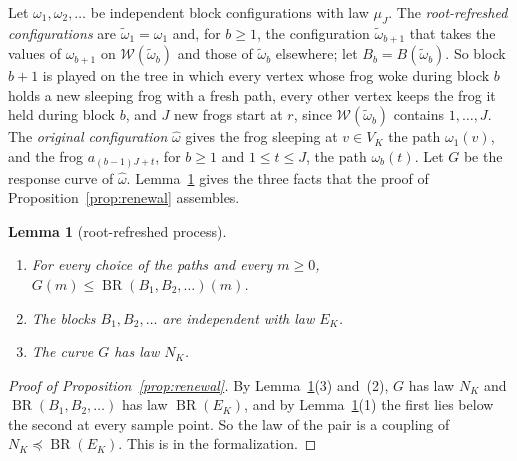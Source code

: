 \documentclass[11pt]{amsart}
\newtheorem{lemma}[theorem]{Lemma}
\theoremstyle{definition}
\numberwithin{equation}{section}
\newcommand{\lean}[1]{\ignorespaces}
\newcommand{\BR}{\operatorname{BR}}
\newcommand{\cW}{\mathcal{W}}
\newcommand{\stle}{\preceq}
\begin{document}
Let $\omega_1,\omega_2,\dots$ be independent block configurations with law $\mu_J$. The \emph{root-refreshed configurations} are $\tilde\omega_1=\omega_1$ and, for $b\ge1$, the configuration $\tilde\omega_{b+1}$ that takes the values of $\omega_{b+1}$ on $\cW(\tilde\omega_b)$ and those of $\tilde\omega_b$ elsewhere; let $B_b=B(\tilde\omega_b)$. So block $b+1$ is played on the tree in which every vertex whose frog woke during block $b$ holds a new sleeping frog with a fresh path, every other vertex keeps the frog it held during block $b$, and $J$ new frogs start at $r$, since $\cW(\tilde\omega_b)$ contains $1,\dots,J$. The \emph{original configuration} $\hat\omega$ gives the frog sleeping at $v\in V_K$ the path $\omega_1(v)$, and the frog $a_{(b-1)J+t}$, for $b\ge1$ and $1\le t\le J$, the path $\omega_b(t)$. Let $G$ be the response curve of $\hat\omega$. Lemma~\ref{lem:refreshed} gives the three facts that the proof of Proposition~\ref{prop:renewal} assembles.

\begin{lemma}[root-refreshed process]\label{lem:refreshed}\lean{FrogModel.LemmaX.claimAPathwise_holds, FrogModel.LemmaX.claimAIid_holds, FrogModel.LemmaX.claimAOrig_holds, FrogModel.LemmaX.ClaimAPathwise, FrogModel.LemmaX.ClaimAIid, FrogModel.LemmaX.ClaimAOrig, FrogModel.LemmaX.refreshSeq, FrogModel.LemmaX.blockWoken, FrogModel.LemmaX.origActive}
\begin{enumerate}
\item For every choice of the paths and every $m\ge0$, $G(m)\le\BR(B_1,B_2,\dots)(m)$.
\item The blocks $B_1,B_2,\dots$ are independent with law $E_K$.
\item The curve $G$ has law $N_K$.
\end{enumerate}
\end{lemma}

\begin{proof}[Proof of Proposition~\ref{prop:renewal}]
By Lemma~\ref{lem:refreshed}(3) and~(2), $G$ has law $N_K$ and $\BR(B_1,B_2,\dots)$ has law $\BR(E_K)$, and by Lemma~\ref{lem:refreshed}(1) the first lies below the second at every sample point. So the law of the pair is a coupling of $N_K\stle\BR(E_K)$. This is  in the formalization.
\end{proof}
\end{document}
